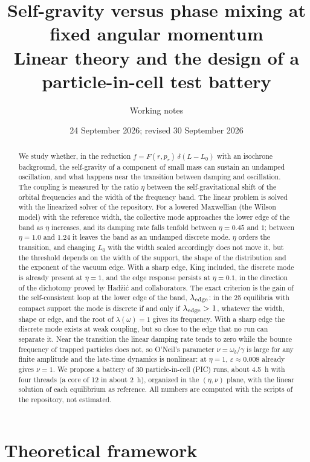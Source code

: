 \documentclass[11pt,a4paper]{article}
\title{Self-gravity versus phase mixing at fixed angular momentum\\[0.3em]
       \large Linear theory and the design of a particle-in-cell test battery}
\author{Working notes}
\date{24 September 2026; revised 30 September 2026}
\begin{document}
\maketitle

\begin{abstract}
We study whether, in the reduction $f=F(r,p_r)\,\delta(L-L_0)$ with an isochrone
background, the self-gravity of a component of small mass can sustain an undamped
oscillation, and what happens near the transition between damping and oscillation.
The coupling is measured by the ratio $\eta$ between the self-gravitational shift of
the orbital frequencies and the width of the frequency band. The linear problem is
solved with the linearized solver of the repository. For a lowered Maxwellian (the
Wilson model) with the reference width, the collective mode approaches the lower edge
of the band as $\eta$ increases, and its damping rate falls tenfold between
$\eta=0.45$ and $1$; between $\eta=1.0$ and $1.24$ it leaves the band as an undamped
discrete mode. $\eta$ orders the transition, and changing $L_0$ with the width scaled
accordingly does not move it, but the threshold depends on the width of the support,
the shape of the distribution and the exponent of the vacuum edge. With a sharp edge,
King included, the discrete mode is already present at $\eta=1$, and the edge response
persists at $\eta=0.1$, in the direction of the dichotomy proved by Hadžić and
collaborators. The exact criterion is the gain of the self-consistent loop at the lower edge
of the band, $\lambda_{\rm edge}$: in the 25 equilibria with compact support the mode is discrete if
and only if $\lambda_{\rm edge}>1$, whatever the width, shape or edge, and the root of
$\lambda(\omega)=1$ gives its frequency. With a sharp edge the discrete mode exists at weak
coupling, but so close to the edge that no run can separate it. Near the transition the linear damping rate tends to zero while the
bounce frequency of trapped particles does not, so O'Neil's parameter
$\nu=\omega_b/\gamma$ is large for any finite amplitude and the late-time dynamics is
nonlinear: at $\eta=1$, $\varepsilon\approx0.008$ already gives $\nu=1$. We propose a
battery of 30 particle-in-cell (PIC) runs, about \SI{4.5}{h} with four threads (a
core of 12 in about \SI{2}{h}), organized in the $(\eta,\nu)$ plane, with the linear
solution of each equilibrium as reference. All numbers are computed with the scripts
of the repository, not estimated.
\end{abstract}

\section{Theoretical framework}
\label{sec:teoria}
\end{document}
